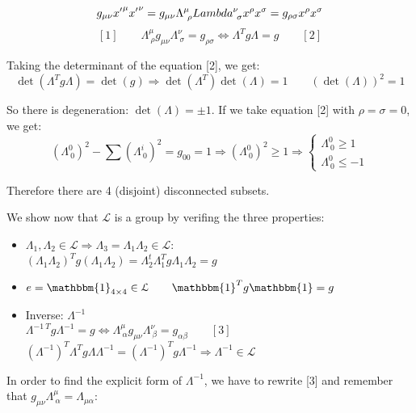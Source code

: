 \documentclass[../../main/main.tex]{subfiles}
\begin{document}
\[
    g_{\mu \nu} {x'}^{\mu} {x'}^{\nu} = g_{\mu \nu} \Lambda^{\mu}_{\ \rho} \\Lambda^{\nu}_{\ \sigma} x^{\rho} x^{\sigma} = g_{\rho \sigma } x^{\rho} x^\sigma
\]
\[
    [1] \qquad
	\Lambda^{\mu}_{\ \rho} g_{\mu \nu} \Lambda^{\nu}_{\ \sigma} = g_{\rho \sigma}
	\iff
	\Lambda ^{T} g \Lambda = g
	\qquad [2]
\]

Taking the determinant of the equation [2], we get:
\[
    \det(\Lambda^{T} g \Lambda) = \det(g)
	\Longrightarrow
	\det(\Lambda ^{T}) \det(\Lambda) = 1
	\qquad
    (\det(\Lambda))^2 = 1
\]

So there is degeneration: \( \det(\Lambda) = \pm 1  \). If we take equation [2] with \( \rho =\sigma =0 \), we get:
\[
    (\Lambda^{0}_{\ 0})^2 - \sum (\Lambda^{i}_{\ 0} )^2 = g_{00} = 1
	\Longrightarrow
	(\Lambda^{0}_{\ 0} )^2 \ge 1
	\Longrightarrow
	\begin{cases}
		\Lambda^{0}_{\ 0} \ge 1	\\
		\Lambda^{0}_{\ 0} \le -1
	\end{cases}
\]

Therefore there are 4 (disjoint) disconnected subsets.

We show now that \( \mathcal{L} \) is a group by verifing the three properties:
\begin{itemize}
	\item \( \Lambda_1, \Lambda_2 \in \mathcal{L}	\Longrightarrow \Lambda_3 = \Lambda_1 \Lambda_2 \in \mathcal{L} \):\\
	\( (\Lambda _1 \Lambda _2 )^T g (\Lambda _1 \Lambda _2) = \Lambda _2 ^t \Lambda _1 ^T g \Lambda _1 \Lambda _2 = g \)

	\item \( e = \mathbbm{1}_{4 \times 4} \in \mathcal{L} \qquad \mathbbm{1}^T g \mathbbm{1} =g \)

	\item Inverse: \( \Lambda ^{-1} \)\\
	\( \Lambda ^{-1 \ T} g \Lambda ^{-1} = g \iff  \Lambda^{\mu}_{\ \alpha} g_{\mu \nu} \Lambda^{\nu}_{\ \beta} = g_{\alpha \beta}	\qquad [3]  \)\\
	\( (\Lambda ^{-1})^T \Lambda ^T g \Lambda \Lambda^{-1} = (\Lambda ^{-1})^T g \Lambda ^{-1}	\Longrightarrow \Lambda ^{-1} \in \mathcal{L}  \)
\end{itemize}

In order to find the explicit form of \( \Lambda ^{-1} \), we have to rewrite [3] and remember that \( g_{\mu \nu} \Lambda^{\mu}_{\ \alpha} = \Lambda_{\mu \alpha}  \):
\end{document}
